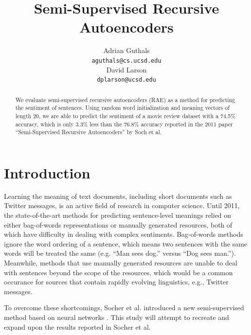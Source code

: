 \documentclass{article}
\title{Semi-Supervised Recursive Autoencoders}
\author{
Adrian Guthals \\
\texttt{aguthals@cs.ucsd.edu} \\
\And
David Larson \\
\texttt{dplarson@ucsd.edu} \\
}
\begin{document}
\maketitle


\begin{abstract}
We evaluate semi-supervised recursive autoencoders (RAE) as a method for predicting the sentiment of sentences. Using random word initialization and meaning vectors of length 20, we are able to predict the sentiment of a movie review dataset with a 74.5\% accuracy, which is only 3.3\% less than the 76.8\% accuracy reported in the 2011 paper ``Semi-Supervised Recursive Autoencoders'' by Soch et al.
\end{abstract}



\section{Introduction}
Learning the meaning of text documents, including short documents such as Twitter messages, is an active field of research in computer science. Until 2011, the state-of-the-art methods for predicting sentence-level meanings relied on either bag-of-words representations or manually generated resources, both of which have difficulty in dealing with complex sentiments.  Bag-of-words methods ignore the word ordering of a sentence, which means two sentences with the same words will be treated the same (e.g. ``Man sees dog.'' versus ``Dog sees man.''). Meanwhile, methods that use manually generated resources are unable to deal with sentences beyond the scope of the resources, which would be a common occurance for sources that contain rapidly evolving linguistics, e.g., Twitter messages.

To overcome these shortcomings, Socher et al. introduced a new semi-supervised method based on neural networks \cite{Socher}. This study will attempt to recreate and expand upon the results reported in Socher et al.



\end{document}
